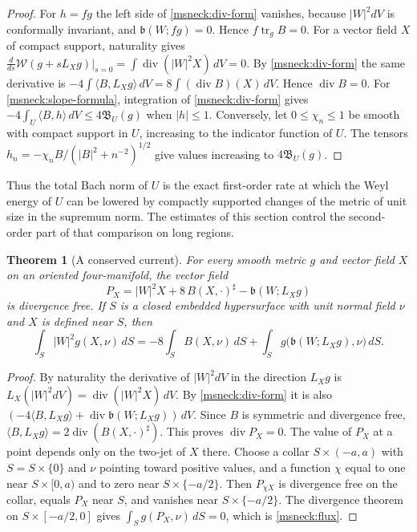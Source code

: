 \documentclass[11pt]{article}
\numberwithin{equation}{section}
\newtheorem{theorem}{Theorem}[section]
\theoremstyle{definition}
\theoremstyle{remark}
\DeclareMathOperator{\tr}{tr}
\begin{document}
\begin{proof}
For \(h=fg\) the left side of \eqref{msneck:div-form} vanishes,
because \(|W|^2dV\) is conformally invariant, and
\(\mathfrak b(W;fg)=0\). Hence \(f\tr_gB=0\). For a vector field \(X\)
of compact support, naturality gives
\(\frac d{ds}\mathcal W(g+sL_Xg)|_{s=0}=\int\operatorname{div}(|W|^2X)\,dV=0\).
By \eqref{msneck:div-form} the same derivative is
\(-4\int\langle B,L_Xg\rangle\,dV=8\int(\operatorname{div}B)(X)\,dV\).
Hence \(\operatorname{div}B=0\). For \eqref{msneck:slope-formula},
integration of \eqref{msneck:div-form} gives
\(-4\int_U\langle B,h\rangle\,dV\le4\mathfrak B_U(g)\) when \(|h|\le1\).
Conversely, let \(0\le\chi_n\le1\) be smooth with compact support in
\(U\), increasing to the indicator function of \(U\). The tensors
\(h_n=-\chi_nB/(|B|^2+n^{-2})^{1/2}\) give values increasing to
\(4\mathfrak B_U(g)\).
\end{proof}

Thus the total Bach norm of \(U\) is the exact first-order rate at which
the Weyl energy of \(U\) can be lowered by compactly supported changes
of the metric of unit size in the supremum norm. The estimates of this
section control the second-order part of that comparison on long
regions.

\begin{theorem}[A conserved current]\label{msneck:noether}
For every smooth metric \(g\) and vector field \(X\) on an oriented
four-manifold, the vector field
\begin{equation}\label{msneck:current}
 P_X=|W|^2X+8\,B(X,\cdot)^\sharp-\mathfrak b(W;L_Xg)
\end{equation}
is divergence free. If \(S\) is a closed embedded hypersurface with unit
normal field \(\nu\) and \(X\) is defined near \(S\), then
\begin{equation}\label{msneck:flux}
 \int_S|W|^2g(X,\nu)\,dS
 =-8\int_SB(X,\nu)\,dS
  +\int_Sg\bigl(\mathfrak b(W;L_Xg),\nu\bigr)\,dS .
\end{equation}
\end{theorem}

\begin{proof}
By naturality the derivative of \(|W|^2dV\) in the direction \(L_Xg\)
is \(L_X(|W|^2dV)=\operatorname{div}(|W|^2X)\,dV\). By
\eqref{msneck:div-form} it is also
\((-4\langle B,L_Xg\rangle+\operatorname{div}\mathfrak b(W;L_Xg))\,dV\).
Since \(B\) is symmetric and divergence free,
\(\langle B,L_Xg\rangle=2\operatorname{div}(B(X,\cdot)^\sharp)\).
This proves \(\operatorname{div}P_X=0\). The value of \(P_X\) at a point
depends only on the two-jet of \(X\) there. Choose a collar
\(S\times(-a,a)\) with \(S=S\times\{0\}\) and \(\nu\) pointing toward
positive values, and a function \(\chi\) equal to one near
\(S\times[0,a)\) and to zero near \(S\times\{-a/2\}\). Then
\(P_{\chi X}\) is divergence free on the collar, equals \(P_X\) near
\(S\), and vanishes near \(S\times\{-a/2\}\). The divergence theorem on
\(S\times[-a/2,0]\) gives \(\int_Sg(P_X,\nu)\,dS=0\), which is
\eqref{msneck:flux}.
\end{proof}
\end{document}
